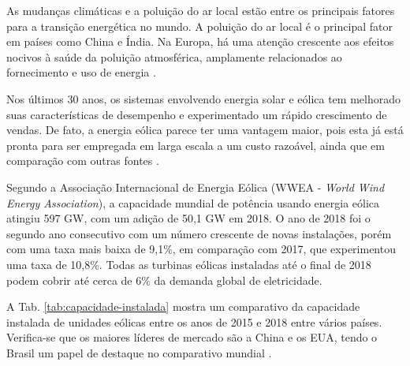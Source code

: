 As mudanças climáticas e a poluição do ar local estão entre os principais fatores para a transição energética no mundo. 
A poluição do ar local é o principal fator em países como China e Índia. 
Na Europa, há uma atenção crescente aos efeitos nocivos à saúde da poluição atmosférica, amplamente relacionados ao fornecimento e uso de energia \cite{Gielen2019}.


Nos últimos 30 anos, os sistemas envolvendo energia solar e eólica tem melhorado suas características de desempenho e experimentado um rápido crescimento de vendas. 
De fato, a energia eólica parece ter uma vantagem maior, pois esta já está pronta para ser empregada em larga escala a um custo razoável, ainda que em comparação com outras fontes \cite{Kumar2016}.

Segundo a Associação Internacional de Energia Eólica (WWEA - \textit{World Wind Energy Association}), a capacidade mundial de potência usando energia eólica atingiu 597 GW, com um adição de 50,1 GW em 2018.
O ano de 2018 foi o segundo ano consecutivo com um número crescente de novas instalações, porém com uma taxa mais baixa de 9,1\%, em comparação com 2017, que experimentou uma taxa de 10,8\%.
Todas as turbinas eólicas instaladas até o final de 2018 podem cobrir até cerca de 6\% da demanda global de eletricidade.

A Tab. \ref{tab:capacidade-instalada} mostra um comparativo da capacidade instalada de unidades eólicas entre os anos de 2015 e 2018 entre vários países.
Verifica-se que os maiores líderes de mercado são a China e os EUA, tendo o Brasil um papel de destaque no comparativo mundial \cite{WEI}.

